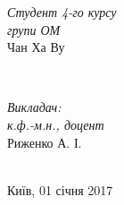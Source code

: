 \begin{titlepage}
\begin{minipage}{0.4\textwidth}
\begin{flushleft} \large
\emph{Студент 4-го курсу}\\
\emph{групи ОМ}\\
Чан Ха Ву %
\end{flushleft}
\end{minipage}
~
\begin{minipage}{0.4\textwidth}
\begin{flushright} \large
\emph{Викладач:} \\
\emph{к.ф.-м.н., доцент} \\
Риженко \textsc{А. І.} %
\end{flushright}
\end{minipage}\\[4cm]



{\large Київ, 01 січня 2017}\\[3cm] %


 

\vfill %
\end{titlepage}

\renewcommand{\refname}{Літератури та посилання}

